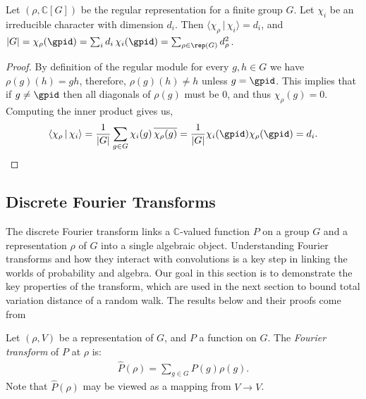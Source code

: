 \documentclass[11pt]{report}
\begin{document}
\begin{lemma}
	\label{chpt3:lem:charreg}
	Let $(\rho,\mathbb{C}[G])$ be the regular representation for a finite group $G$. Let $\chi_{i}$ be an irreducible character with dimension $d_{i}$. Then $\langle \chi_{\rho} \,|\, \chi_{i} \rangle = d_{i}$, and $ |G| = \chi_{\rho}(\gpid) = \sum_{i} d_{i} \,\chi_{i}(\gpid) = \sum_{\rho \in \rep(G)} d_{\rho}^{2}$.
\end{lemma}
\begin{proof}
	By definition of the regular module for every $g,h \in G$ we have $\rho(g)(h) = gh$,  therefore, $\rho(g)(h) \neq h$ unless $g =\gpid$. This implies that if $g\neq \gpid$ then all diagonals of $\rho(g)$ must be $0$, and thus $\chi_{\rho}(g)=0$.
	Computing the inner product gives us,
	\[\langle \chi_{\rho} \,|\, \chi_{i} \rangle = \frac{1}{|G|}\sum_{g\in G} \chi_{i}(g) \, \overline{\chi_{\rho}(g)}   = \frac{1}{|G|} \chi_{i}(\gpid) \chi_{\rho}(\gpid) = d_{i}  \qedhere.\]
\end{proof}






















\subsection{Discrete Fourier Transforms}
\label{chpt3:sec:fourier}
The discrete Fourier 
transform links a $\mathbb{C}$-valued function $P$ on a group $G$ and a representation $\rho$ of $G$ into a 
single algebraic object. Understanding Fourier transforms and how they 
interact with convolutions is a key step in linking the worlds of probability and algebra. Our goal in this 
section is to demonstrate the key properties of the transform, which are used in the next section to bound total 
variation distance of a random walk. The results below and their proofs come from \cite[Chapter 2]{Diaconis1988}



\begin{defn}
	Let $(\rho,V)$ be a representation of $G$, and $P$ a function on $G$. The 
	\emph{Fourier transform} of $P$ at $\rho$ is:
	\begin{eqnarray}
	\label{chpt3:eqn:convolution}
	\hat{P}(\rho) = \sum_{g \in G} P(g)\rho(g).
	\end{eqnarray}
	Note that $\hat{P}(\rho)$ may be viewed as a mapping from $V\to V$.
\end{defn}
\end{document}
